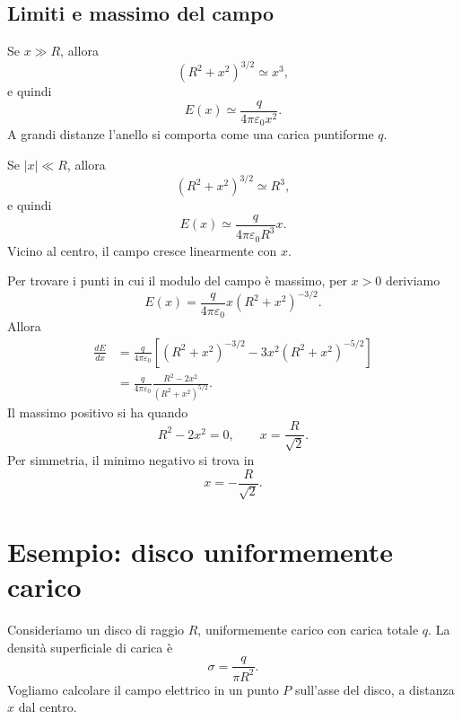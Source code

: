 \documentclass[a4paper]{article}
\begin{document}
\subsection{Limiti e massimo del campo}

Se \(x\gg R\), allora
\[
    (R^2+x^2)^{3/2}\simeq x^3,
\]
e quindi
\[
    E(x)\simeq \frac{q}{4\pi\varepsilon_0x^2}.
\]
A grandi distanze l'anello si comporta come una carica puntiforme \(q\).

Se \(|x|\ll R\), allora
\[
    (R^2+x^2)^{3/2}\simeq R^3,
\]
e quindi
\[
    E(x)\simeq \frac{q}{4\pi\varepsilon_0R^3}x.
\]
Vicino al centro, il campo cresce linearmente con \(x\).

Per trovare i punti in cui il modulo del campo è massimo, per \(x>0\) deriviamo
\[
    E(x)=\frac{q}{4\pi\varepsilon_0}x(R^2+x^2)^{-3/2}.
\]
Allora
\begin{align*}
    \frac{dE}{dx}
    &=\frac{q}{4\pi\varepsilon_0}\left[(R^2+x^2)^{-3/2}-3x^2(R^2+x^2)^{-5/2}\right] \\
    &=\frac{q}{4\pi\varepsilon_0}\frac{R^2-2x^2}{(R^2+x^2)^{5/2}}.
\end{align*}
Il massimo positivo si ha quando
\[
    R^2-2x^2=0,
    \qquad
    x=\frac{R}{\sqrt{2}}.
\]
Per simmetria, il minimo negativo si trova in
\[
    x=-\frac{R}{\sqrt{2}}.
\]

\begin{center}
\end{center}

\section{Esempio: disco uniformemente carico}

Consideriamo un disco di raggio \(R\), uniformemente carico con carica totale \(q\). La densità superficiale di carica è
\[
    \sigma=\frac{q}{\pi R^2}.
\]
Vogliamo calcolare il campo elettrico in un punto \(P\) sull'asse del disco, a distanza \(x\) dal centro.
\end{document}
